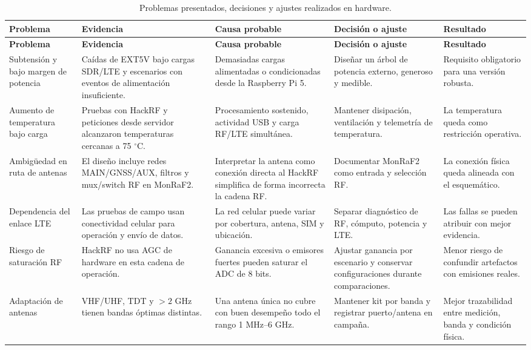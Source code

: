 \scriptsize
\setlength{\tabcolsep}{3pt}
\begin{longtable}{@{}p{1.9cm} p{2.6cm} p{2.6cm} p{3cm} p{2.1cm}@{}}
\caption{Problemas presentados, decisiones y ajustes realizados en hardware.}
\label{tab:hw_problemas}\\
\toprule
\textbf{Problema} & \textbf{Evidencia} & \textbf{Causa probable} & \textbf{Decisión o ajuste} & \textbf{Resultado} \\
\midrule
\endfirsthead
\toprule
\textbf{Problema} & \textbf{Evidencia} & \textbf{Causa probable} & \textbf{Decisión o ajuste} & \textbf{Resultado} \\
\midrule
\endhead
Subtensión y bajo margen de potencia & Caídas de EXT5V bajo cargas SDR/LTE y escenarios con eventos de alimentación insuficiente. & Demasiadas cargas alimentadas o condicionadas desde la Raspberry Pi 5. & Diseñar un árbol de potencia externo, generoso y medible. & Requisito obligatorio para una versión robusta. \\
Aumento de temperatura bajo carga & Pruebas con HackRF y peticiones desde servidor alcanzaron temperaturas cercanas a 75 $^\circ$C. & Procesamiento sostenido, actividad USB y carga RF/LTE simultánea. & Mantener disipación, ventilación y telemetría de temperatura. & La temperatura queda como restricción operativa. \\
Ambigüedad en ruta de antenas & El diseño incluye redes MAIN/GNSS/AUX, filtros y mux/switch RF en MonRaF2. & Interpretar la antena como conexión directa al HackRF simplifica de forma incorrecta la cadena RF. & Documentar MonRaF2 como entrada y selección RF. & La conexión física queda alineada con el esquemático. \\
Dependencia del enlace LTE & Las pruebas de campo usan conectividad celular para operación y envío de datos. & La red celular puede variar por cobertura, antena, SIM y ubicación. & Separar diagnóstico de RF, cómputo, potencia y LTE. & Las fallas se pueden atribuir con mejor evidencia. \\
Riesgo de saturación RF & HackRF no usa AGC de hardware en esta cadena de operación. & Ganancia excesiva o emisores fuertes pueden saturar el ADC de 8 bits. & Ajustar ganancia por escenario y conservar configuraciones durante comparaciones. & Menor riesgo de confundir artefactos con emisiones reales. \\
Adaptación de antenas & VHF/UHF, TDT y $>2$ GHz tienen bandas óptimas distintas. & Una antena única no cubre con buen desempeño todo el rango 1 MHz--6 GHz. & Mantener kit por banda y registrar puerto/antena en campaña. & Mejor trazabilidad entre medición, banda y condición física. \\
\bottomrule
\end{longtable}
\setlength{\tabcolsep}{6pt}
\normalsize

